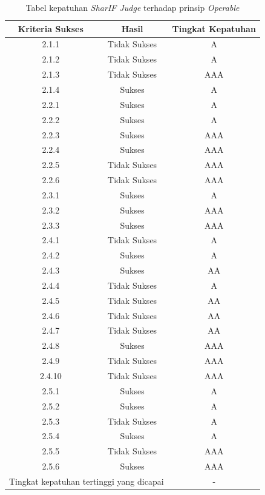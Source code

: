 \documentclass[a4paper,twoside]{article}
\begin{document}
\begin{enumerate}
		\begin{table}[H]
			\centering
			\caption{Tabel kepatuhan \textit{SharIF Judge} terhadap prinsip \textit{Operable}}
			\label{tab:kepatuhan_sharif_judge_operable}
			\begin{tabular}{|c|c|c|}
				\hline
				Kriteria Sukses & Hasil & Tingkat Kepatuhan \\
				\hline
				2.1.1 & Tidak Sukses & A\\
				2.1.2 & Tidak Sukses & A\\
				2.1.3 & Tidak Sukses & AAA\\
				2.1.4 & Sukses & A\\
				2.2.1 & Sukses & A\\
				2.2.2 & Sukses & A\\
				2.2.3 & Sukses & AAA\\
				2.2.4 & Sukses & AAA\\
				2.2.5 & Tidak Sukses & AAA\\
				2.2.6 & Tidak Sukses & AAA\\
				2.3.1 & Sukses & A\\
				2.3.2 & Sukses & AAA\\
				2.3.3 & Sukses & AAA\\
				2.4.1 & Tidak Sukses & A\\
				2.4.2 & Sukses & A\\
				2.4.3 & Sukses & AA\\
				2.4.4 & Tidak Sukses & A\\
				2.4.5 & Tidak Sukses & AA\\
				2.4.6 & Tidak Sukses & AA\\
				2.4.7 & Tidak Sukses & AA\\
				2.4.8 & Sukses & AAA\\
				2.4.9 & Tidak Sukses & AAA\\
				2.4.10 & Tidak Sukses & AAA\\
				2.5.1 & Sukses & A\\
				2.5.2 & Sukses & A\\
				2.5.3 & Tidak Sukses & A\\
				2.5.4 & Sukses & A\\
				2.5.5 & Tidak Sukses & AAA\\
				2.5.6 & Sukses & AAA\\
				\hline
				\multicolumn{2}{|c|}{Tingkat kepatuhan tertinggi yang dicapai} & - \\
				\hline
			\end{tabular}
		\end{table}
		

\end{enumerate}
\end{document}
